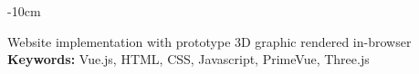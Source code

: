 \documentclass[10pt,a4paper]{altacv}
\begin{document}
\begin{adjustwidth}{}{-10cm}

    Website implementation with prototype 3D graphic rendered in-browser \\
    \textbf{Keywords:} Vue.js, HTML, CSS, Javascript, PrimeVue, Three.js\\







    
\end{adjustwidth}

\end{document}
